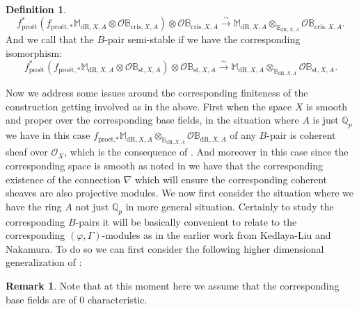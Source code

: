 \documentclass[12pt]{amsart}
\theoremstyle{definition}
\newtheorem{definition}[theorem]{Definition}
\newtheorem{remark}[theorem]{Remark}
\numberwithin{equation}{section}
\begin{document}
\begin{definition}
\begin{displaymath}
f^*_\text{pro\'et}(f_{\text{pro\'et},*} \mathbb{M}_{\mathrm{dR},X,A}\otimes	 \mathcal{O}\mathbb{B}_{\mathrm{cris},X,A})\otimes\mathcal{O}\mathbb{B}_{\mathrm{cris},X,A} \overset{\sim}{\rightarrow} \mathbb{M}_{\mathrm{dR},X,A}\otimes_{\mathbb{B}_{\mathrm{dR},X,A}}	 \mathcal{O}\mathbb{B}_{\mathrm{cris},X,A}.
\end{displaymath}
And we call that the $B$-pair semi-stable if we have the corresponding isomorphism:
\begin{displaymath}
f^*_\text{pro\'et}(f_{\text{pro\'et},*} \mathbb{M}_{\mathrm{dR},X,A}\otimes	 \mathcal{O}\mathbb{B}_{\mathrm{st},X,A})\otimes\mathcal{O}\mathbb{B}_{\mathrm{st},X,A} \overset{\sim}{\rightarrow} \mathbb{M}_{\mathrm{dR},X,A}\otimes_{\mathbb{B}_{\mathrm{dR},X,A}}	 \mathcal{O}\mathbb{B}_{\mathrm{st},X,A}.
\end{displaymath}	
\end{definition}












\indent Now we address some issues around the corresponding finiteness of the construction getting involved as in the above. First when the space $X$ is smooth and proper over the corresponding base fields, in the situation where $A$ is just $\mathbb{Q}_p$ we have in this case $f_\text{pro\'et,*} \mathbb{M}_{\mathrm{dR},X,A}\otimes_{\mathbb{B}_{\mathrm{dR},X,A}}	 \mathcal{O}\mathbb{B}_{\mathrm{dR},X,A}$ of any $B$-pair is coherent sheaf over $\mathcal{O}_X$, which is the consequence of \cite[Theorem 8.6.2 (a)]{KL16}. And moreover in this case since the corresponding space is smooth as noted in \cite[Definition 10.10]{KL3} we have that the corresponding existence of the connection $\nabla$ which will ensure the corresponding coherent sheaves are also projective modules. We now first consider the situation where we have the ring $A$ not just $\mathbb{Q}_p$ in more general situation. Certainly to study the corresponding $B$-pairs it will be basically convenient to relate to the corresponding $(\varphi,\Gamma)$-modules as in the earlier work from Kedlaya-Liu and Nakamura. To do so we can first consider the following higher dimensional generalization of \cite[Theorem 2.18]{KP}:



\begin{remark}
Note that at this moment here we assume that the corresponding base fields are of 0 characteristic.	
\end{remark}
\end{document}
